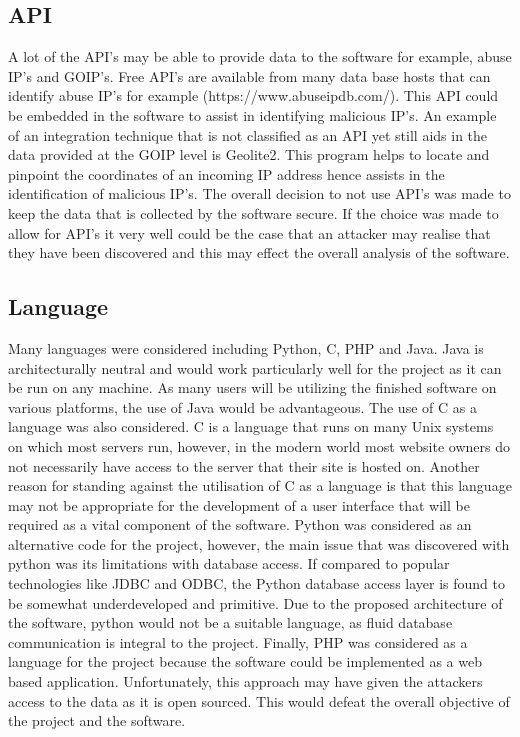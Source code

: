 \subsection*{API }
A lot of the API's may be able to provide data to the software for example, abuse IP's and GOIP's. Free API's are available from many data base hosts that can identify abuse IP's for example (https://www.abuseipdb.com/). This API could be embedded in the software to assist in identifying malicious IP's. An example of an integration technique that is not classified as an API yet still aids in the data provided at the GOIP level is Geolite2. This program helps to locate and pinpoint the coordinates of an incoming IP address hence assists in the identification of malicious IP's. The overall decision to not use API's was made to keep the data that is collected by the software secure. If the choice was made to allow for API's it very well could be the case that an attacker may realise that they have been discovered and this may effect the overall analysis of the software.

\subsection*{Language} \label{Language}
Many languages were considered including Python, C, PHP and Java. Java is architecturally neutral and would work particularly well for the project as it can be run on any machine. As many users will be utilizing the finished software on various platforms, the use of Java would be advantageous. The use of C as a language was also considered. C is a language that runs on many Unix systems on which most servers run, however, in the modern world most website owners do not necessarily have access to the server that their site is hosted on. Another reason for standing against the utilisation of C as a language is that this language may not be appropriate for the development of a user interface that will be required as a vital component of the software. Python was considered as an alternative code for the project, however, the main issue that was discovered with python was its limitations with database access. If compared to popular technologies like JDBC and ODBC, the Python database access layer is found to be somewhat underdeveloped and primitive. Due to the proposed architecture of the software, python would not be a suitable language, as fluid database communication is integral to the project. Finally, PHP was considered as a language for the project because the software could be implemented as a web based application. Unfortunately, this approach may have given the attackers access to the data as it is open sourced. This would defeat the overall objective of the project and the software.  

